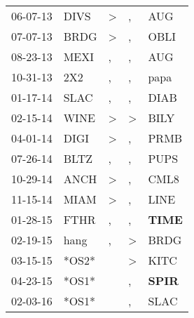 \begin{supertabular}{p{0.07\textwidth}p{0.06\textwidth}p{0.02\textwidth}p{0.02\textwidth}p{0.06\textwidth}}
          06-07-13\textsuperscript{} &           DIVS\textsuperscript{} &     \textgreater &             , &            AUG\textsuperscript{} \\
          07-07-13\textsuperscript{} &           BRDG\textsuperscript{} &     \textgreater &             , &           OBLI\textsuperscript{} \\
          08-23-13\textsuperscript{} &           MEXI\textsuperscript{} &                , &             , &            AUG\textsuperscript{} \\
          10-31-13\textsuperscript{} &            2X2\textsuperscript{} &                , &             , &           papa\textsuperscript{} \\
          01-17-14\textsuperscript{} &           SLAC\textsuperscript{} &                , &             , &           DIAB\textsuperscript{} \\
          02-15-14\textsuperscript{} &           WINE\textsuperscript{} &     \textgreater &  \textgreater &           BILY\textsuperscript{} \\
          04-01-14\textsuperscript{} &           DIGI\textsuperscript{} &     \textgreater &             , &           PRMB\textsuperscript{} \\
          07-26-14\textsuperscript{} &           BLTZ\textsuperscript{} &                , &             , &           PUPS\textsuperscript{} \\
          10-29-14\textsuperscript{} &           ANCH\textsuperscript{} &     \textgreater &             , &           CML8\textsuperscript{} \\
          11-15-14\textsuperscript{} &           MIAM\textsuperscript{} &     \textgreater &             , &           LINE\textsuperscript{} \\
          01-28-15\textsuperscript{} &           FTHR\textsuperscript{} &                , &             , &  \textbf{TIME\textsuperscript{}} \\
          02-19-15\textsuperscript{} &           hang\textsuperscript{} &                , &  \textgreater &           BRDG\textsuperscript{} \\
          03-15-15\textsuperscript{} &                            *OS2* &                  &  \textgreater &           KITC\textsuperscript{} \\
          04-23-15\textsuperscript{} &                            *OS1* &                  &             , &  \textbf{SPIR\textsuperscript{}} \\
          02-03-16\textsuperscript{} &                            *OS1* &                  &             , &           SLAC\textsuperscript{} \\

\end{supertabular}
